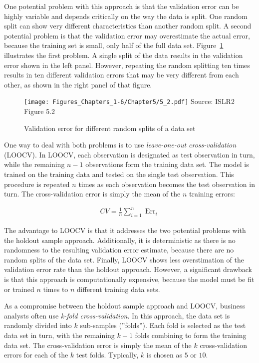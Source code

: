 One potential problem with this approach is that the validation error can be highly variable and depends critically on the way the data is split. One random split can show very different characteristics than another random split. A second potential problem is that the validation error may overestimate the actual error, because the training set is small, only half of the full data set. Figure~\ref{fig:holdout} illustrates the first problem. A single split of the data results in the validation error shown in the left panel. However, repeating the random splitting ten times results in ten different validation errors that may be very different from each other, as shown in the right panel of that figure.

\begin{figure}[b]
\centering 

\texttt{[image: Figures\_Chapters\_1-6/Chapter5/5\_2.pdf]}
\scriptsize Source: ISLR2 Figure 5.2
\caption{Validation error for different random splits of a data set}
\label{fig:holdout}
\end{figure}

One way to deal with both problems is to use \emph{leave-one-out cross-validation} (LOOCV). In LOOCV, each observation is designated as test observation in turn, while the remaining $n-1$ observations form the training data set. The model is trained on the training data and tested on the single test observation. This procedure is repeated $n$ times as each observation becomes the test observation in turn. The cross-validation error is simply the mean of the $n$ training errors:

\begin{align*}
CV = \frac{1}{n} \sum\nolimits_{i=1}^n \operatorname{Err}_i
\end{align*}

The advantage to LOOCV is that it addresses the two potential problems with the holdout sample approach. Additionally, it is deterministic as there is no randomness to the resulting validation error estimate, because there are no random splits of the data set. Finally, LOOCV shows less overstimation of the validation error rate than the holdout approach. However, a significant drawback is that this approach is computationally expensive, because the model must be fit or trained $n$ times to $n$ different training data sets. 

As a compromise between the holdout sample approach and LOOCV, business analysts often use \emph{k-fold cross-validation}. In this approach, the data set is randomly divided into $k$ sub-samples (''folds''). Each fold is selected as the test data set in turn, with the remaining $k-1$ folds combining to form the training data set. The cross-validation error is simply the mean of the $k$ cross-validation errors for each of the $k$ test folds. Typically, $k$ is chosen as $5$ or $10$.

